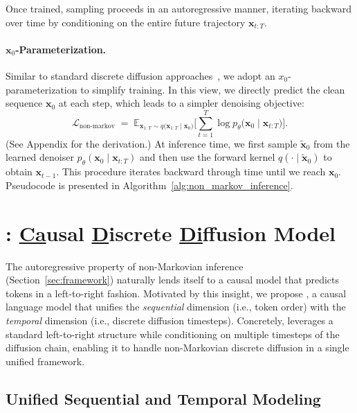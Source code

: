Once trained, sampling proceeds in an autoregressive manner, iterating backward over time by conditioning on the entire future trajectory \(\mathbf{x}_{t:T}\).

\paragraph{\(\textbf{x}_0\)-Parameterization.}
Similar to standard discrete diffusion approaches~\citep{udlm, gat2024discreteflowmatching}, we adopt an \(x_0\)-parameterization to simplify training. In this view, we directly predict the clean sequence \(\mathbf{x}_0\) at each step, which leads to a simpler denoising objective:
\begin{equation}
    \mathcal{L}_{\text{non-markov}}
    \;=\;
    \mathbb{E}_{\mathbf{x}_{1: T} \sim q\bigl( \mathbf{x}_{1:T} \mid \mathbf{x}_0\bigr)}\!\Biggl[
        \sum_{t=1}^T  
        \log p_\theta\bigl(\mathbf{x}_0 \mid \mathbf{x}_{t:T}\bigr)
    \Biggr].
\end{equation}
(See Appendix for the derivation.) At inference time, we first sample \(\widetilde{\mathbf{x}}_0\) from the learned denoiser \(p_\theta(\mathbf{x}_0 \mid \mathbf{x}_{t:T})\) and then use the forward kernel \(q(\cdot \mid \widetilde{\mathbf{x}}_0)\) to obtain \(\mathbf{x}_{t-1}\). This procedure iterates backward through time until we reach \(\mathbf{x}_0\). Pseudocode is presented in Algorithm~\ref{alg:non_markov_inference}.


\section{\method{}: \underline{Ca}usal \underline{D}iscrete \underline{Di}ffusion Model}
\label{sec:method}

The autoregressive property of non-Markovian inference (Section~\ref{sec:framework}) naturally lends itself to a causal model that predicts tokens in a left-to-right fashion. Motivated by this insight, we propose \textbf{\method{}}, a causal language model that unifies the \textit{sequential} dimension (i.e., token order) with the \textit{temporal} dimension (i.e., discrete diffusion timesteps). Concretely, \method{} leverages a standard left-to-right structure while conditioning on multiple timesteps of the diffusion chain, enabling it to handle non-Markovian discrete diffusion in a single unified framework.

\subsection{Unified Sequential and Temporal Modeling}

